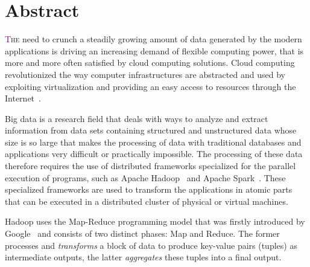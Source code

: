 
\begingroup
\let\clearpage\relax
\let\cleardoublepage\relax
\let\cleardoublepage\relax

\chapter*{Abstract}
\lettrine[lines=4]{\textcolor{purple}{T}}{he} need to crunch a steadily growing amount of data generated by the modern applications is driving an increasing demand of flexible computing power, that is more and more often satisfied by cloud computing solutions. Cloud computing  revolutionized the way computer infrastructures are abstracted and used by exploiting virtualization and providing an easy access to resources through the Internet~\cite{articleBigData:2017}.


Big data is a research field that deals with ways to analyze and extract information from data sets containing structured and unstructured data whose size is so large that makes the processing of data with traditional databases and applications very difficult or practically impossible. The processing of these data therefore requires the use of distributed frameworks specialized for the parallel execution of programs, such as Apache Hadoop~\cite{misc:ApacheHadoop} and Apache Spark~\cite{misc:ApacheSpark}. These specialized frameworks are used to transform the applications in atomic parts that can be executed in a distributed cluster of physical or virtual machines. 

Hadoop uses the Map-Reduce programming model that was firstly introduced by Google~\cite{misc:GoogleMapReduce} and consists of two distinct phases: Map and Reduce. %
The former processes and \textit{transforms} a block of data to produce key-value pairs (tuples) as intermediate outputs, the latter \textit{aggregates} these tuples into a final output.

